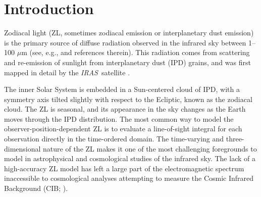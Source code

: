 \documentclass[twocolumn]{aa}
\def\IRAS{\textit{IRAS}}
\begin{document}
{   %
   }


   \maketitle

   

\section{Introduction}
Zodiacal light (ZL, sometimes zodiacal emission or interplanetary dust
emission) is the primary source of diffuse radiation observed in the
infrared sky between 1--100 $\mu$m (see, e.g., \citealp{Leinert1998}
and references therein). This radiation comes from scattering and
re-emission of sunlight from interplanetary dust (IPD) grains, and was
first mapped in detail by the \IRAS\ satellite
\citep{neugebauer:1984}.

The inner Solar System is embedded in a Sun-centered cloud of IPD,
with a symmetry axis tilted slightly with respect to the Ecliptic,
known as the zodiacal cloud. The ZL is seasonal, and its appearance in
the sky changes as the Earth moves through the IPD distribution. The
most common way to model the observer-position-dependent ZL is to
evaluate a line-of-sight integral for each observation directly in the
time-ordered domain. The time-varying and three-dimensional nature of
the ZL makes it one of the most challenging foregrounds to model in
astrophysical and cosmological studies of the infrared sky. The lack
of a high-accuracy ZL model has left a large part of the
electromagnetic spectrum inaccessible to cosmological analyses
attempting to measure the Cosmic Infrared Background (CIB;
\citealp{partridge1967}). 
\end{document}
